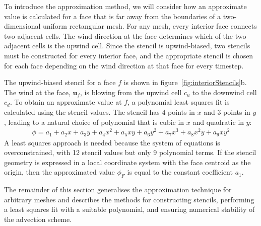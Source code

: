 To introduce the approximation method, we will consider how an approximate value is calculated for a face that is far away from the boundaries of a two-dimensional uniform rectangular mesh.  For any mesh, every interior face connects two adjacent cells.  The wind direction at the face determines which of the two adjacent cells is the upwind cell.  Since the stencil is upwind-biased, two stencils must be constructed for every interior face, and the appropriate stencil is chosen for each face depending on the wind direction at that face for every timestep.

The upwind-biased stencil for a face $f$ is shown in figure~\ref{fig:interiorStencils}b.  The wind at the face, $\mathbf{u}_f$, is blowing from the upwind cell $c_u$ to the downwind cell $c_d$.
To obtain an approximate value at $f$, a polynomial least squares fit is calculated using the stencil values.
The stencil has \num{4} points in $x$ and \num{3} points in $y$, leading to a natural choice of polynomial that is cubic in $x$ and quadratic in $y$:
\begin{align}
	\phi = a_1 + a_2 x + a_3 y + a_4 x^2 + a_5 xy + a_6 y^2 + a_7 x^3 + a_8 x^2 y + a_9 x y^2 \label{eqn:fullPoly}
\end{align}
A least squares approach is needed because the system of equations is overconstrained, with \num{12} stencil values but only \num{9} polynomial terms.  If the stencil geometry is expressed in a local coordinate system with the face centroid as the origin, then the approximated value $\phi_F$ is equal to the constant coefficient $a_1$.

The remainder of this section generalises the approximation technique for arbitrary meshes and describes the methods for constructing stencils, performing a least squares fit with a suitable polynomial, and ensuring numerical stability of the advection scheme.

